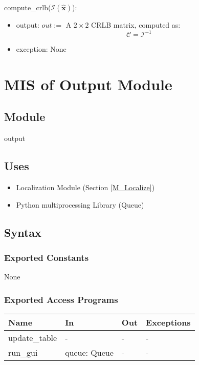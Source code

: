 \documentclass[12pt, titlepage]{article}
\begin{document}
\noindent compute\_crlb($\boldsymbol{\mathcal{I}}(\hat{\mathbf{x}})$):
\begin{itemize}
\item output: $out:=$ A \( 2 \times 2 \) CRLB matrix, computed as:
\[
\boldsymbol{\mathcal{C}} = \boldsymbol{\mathcal{I}}^{-1}
\]
\item exception: None
\end{itemize}


\newpage

\section{MIS of Output Module} \label{M_Output} 
\subsection{Module}

output

\subsection{Uses}
\begin{itemize}
  \item Localization Module (Section \ref{M_Localize})
  \item Python multiprocessing Library (Queue)
\end{itemize}

\subsection{Syntax}

\subsubsection{Exported Constants}
None

\subsubsection{Exported Access Programs}

\begin{center}
\begin{tabular}{p{4cm} p{4cm} p{4cm} p{2cm}}
\hline
\textbf{Name} & \textbf{In} & \textbf{Out} & \textbf{Exceptions} \\
\hline
update\_table & - & - & - \\
run\_gui & queue: Queue & - & - \\
\hline
\end{tabular}
\end{center}
\end{document}
